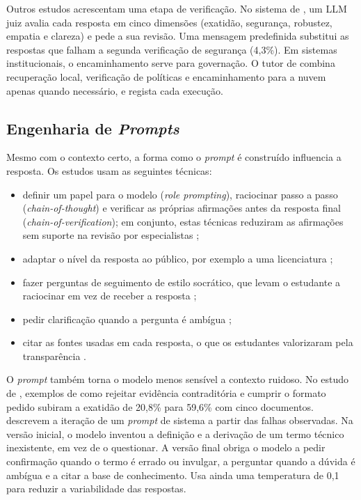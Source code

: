 Outros estudos acrescentam uma etapa de verificação. No sistema de \textcite{bellard2025development}, um \gls{LLM} juiz avalia cada resposta em cinco dimensões (exatidão, segurança, robustez, empatia e clareza) e pede a sua revisão. Uma mensagem predefinida substitui as respostas que falham a segunda verificação de segurança (4,3\%). Em sistemas institucionais, o encaminhamento serve para governação. O tutor de \textcite{wei2026cloud} combina recuperação local, verificação de políticas e encaminhamento para a nuvem apenas quando necessário, e regista cada execução.

\subsection{Engenharia de \emph{Prompts}}
\label{sec:chap2_prompting}

Mesmo com o contexto certo, a forma como o \emph{prompt} é construído influencia a resposta. Os estudos usam as seguintes técnicas:
\begin{itemize}
    \item definir um papel para o modelo (\emph{role prompting}), raciocinar passo a passo (\emph{chain-of-thought}) e verificar as próprias afirmações antes da resposta final (\emph{chain-of-verification}); em conjunto, estas técnicas reduziram as afirmações sem suporte na revisão por especialistas \parencite{ishadya2026mitigating};
    \item adaptar o nível da resposta ao público, por exemplo a uma licenciatura \parencite{yan2026question};
    \item fazer perguntas de seguimento de estilo socrático, que levam o estudante a raciocinar em vez de receber a resposta \parencite{sayeed2026tutor};
    \item pedir clarificação quando a pergunta é ambígua \parencite{yan2026question};
    \item citar as fontes usadas em cada resposta, o que os estudantes valorizaram pela transparência \parencite{seshadri2026alan}.
\end{itemize} O \emph{prompt} também torna o modelo menos sensível a contexto ruidoso. No estudo de \textcite{rahat2026noise}, exemplos de como rejeitar evidência contraditória e cumprir o formato pedido subiram a exatidão de 20,8\% para 59,6\% com cinco documentos. \textcite{yan2026question} descrevem a iteração de um \emph{prompt} de sistema a partir das falhas observadas. Na versão inicial, o modelo inventou a definição e a derivação de um termo técnico inexistente, em vez de o questionar. A versão final obriga o modelo a pedir confirmação quando o termo é errado ou invulgar, a perguntar quando a dúvida é ambígua e a citar a base de conhecimento. Usa ainda uma temperatura de 0,1 para reduzir a variabilidade das respostas.

